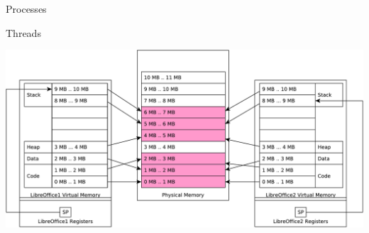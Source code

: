 \documentclass{beamer}
\begin{document}
\begin{frame}{Processes}
\begin{center}
\end{center}
\end{frame}

\begin{frame}{Threads}
\begin{center}
  \includegraphics[width=1\linewidth]{thread}
\end{center}
\end{frame}
\end{document}
